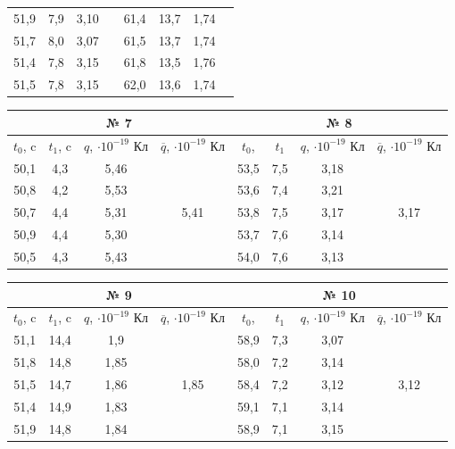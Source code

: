 \documentclass[a4paper, 12pt]{article}%
\begin{document}
\begin{enumerate}
\begin{longtable} {|c|c|c|c|c|c|c|c|}
	51,9 & 7,9 & 3,10 &  & 61,4 & 13,7 & 1,74 &  \\ \hhline{---~---~}
	51,7 & 8,0 & 3,07 &  & 61,5 & 13,7 & 1,74 &  \\ \hhline{---~---~}
	51,4 & 7,8 & 3,15 &  & 61,8 & 13,5 & 1,76 &  \\ \hhline{---~---~}
	51,5 & 7,8 & 3,15 &  & 62,0 & 13,6 & 1,74 &  \\ \hline
\end{longtable}
\begin{longtable} {|c|c|c|c|c|c|c|c|}
	\hline
	\multicolumn{4}{|c|}{№ 7} & \multicolumn{4}{c|}{№ 8} \\ \hline
	$t_0$, c& $t_1$, c & $q$, $\cdot 10^{-19}$ Кл & $\overline{q}$, $\cdot 10^{-19}$ Кл & 	$t_0$, & $t_1$ & $q$, $\cdot 10^{-19}$ Кл & $\overline{q}$, $\cdot 10^{-19}$ Кл\\ \hline
	50,1 & 4,3 & 5,46 & \multirow{5}{*}{5,41} & 53,5 & 7,5 & 3,18 & \multirow{5}{*}{3,17} \\ \hhline{---~---~}
	50,8 & 4,2 & 5,53 &  & 53,6 & 7,4 & 3,21 &  \\ \hhline{---~---~}
	50,7 & 4,4 & 5,31 &  & 53,8 & 7,5 & 3,17 &  \\ \hhline{---~---~}
	50,9 & 4,4 & 5,30 &  & 53,7 & 7,6 & 3,14 &  \\ \hhline{---~---~}
	50,5 & 4,3 & 5,43 &  & 54,0 & 7,6 & 3,13 &  \\ \hline
\end{longtable}
\begin{longtable} {|c|c|c|c|c|c|c|c|}
	\hline
	\multicolumn{4}{|c|}{№ 9} & \multicolumn{4}{c|}{№ 10} \\ \hline
	$t_0$, c& $t_1$, c & $q$, $\cdot 10^{-19}$ Кл & $\overline{q}$, $\cdot 10^{-19}$ Кл & 	$t_0$, & $t_1$ & $q$, $\cdot 10^{-19}$ Кл & $\overline{q}$, $\cdot 10^{-19}$ Кл\\ \hline
	51,1 & 14,4 & 1,9 & \multirow{5}{*}{1,85} & 58,9 & 7,3 & 3,07 & \multirow{5}{*}{3,12} \\ \hhline{---~---~}
	51,8 & 14,8 & 1,85 &  & 58,0 & 7,2 & 3,14 &  \\ \hhline{---~---~}
	51,5 & 14,7 & 1,86 &  & 58,4 & 7,2 & 3,12 &  \\ \hhline{---~---~}
	51,4 & 14,9 & 1,83 &  & 59,1 & 7,1 & 3,14 &  \\ \hhline{---~---~}
	51,9 & 14,8 & 1,84 &  & 58,9 & 7,1 & 3,15 &  \\ \hline
\end{longtable}
	
	
	
	
	
	
	
	
	
	
	
	
	
	
	
	
	
	
	
	
	
	
	
	
	
	
	
	\end{enumerate}
	
	
	
	
\end{document}
